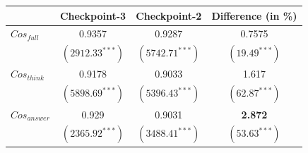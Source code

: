 \begin{table}[htp]
    \centering
    \footnotesize
    \begin{tabular}{l c c c}
        \toprule
        & Checkpoint-3&     Checkpoint-2& Difference (in \%)\\
        \hline
        $Cos_{full}$&0.9357&0.9287&0.7575\\ 
                    &$({2912.33}^{***})$&$({5742.71}^{***})$&$({19.49}^{***})$\\ 
        $Cos_{think}$&0.9178&0.9033&1.617\\ 
                    &$({5898.69}^{***})$&$({5396.43}^{***})$&$({62.87}^{***})$\\ 
        $Cos_{answer}$&0.929&0.9031&\textbf{2.872}\\ 
                    &$({2365.92}^{***})$&$({3488.41}^{***})$&$({53.63}^{***})$\\
        \hline

\end{tabular}
\end{table}
